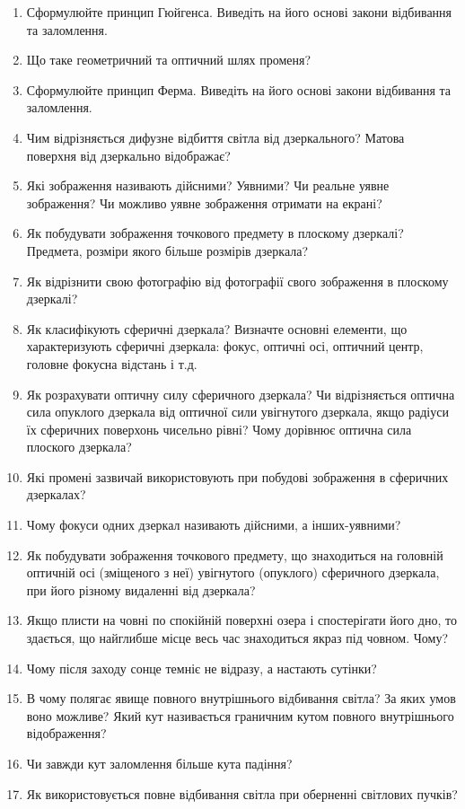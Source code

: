 \documentclass[12pt]{article}
\begin{document}
\begin{enumerate}[label*=\bfseries\color{red!60!black}\arabic*.,ref=\arabic*, wide,leftmargin=*]
\item Сформулюйте принцип Гюйгенса. Виведіть на його основі закони відбивання та заломлення.
\item Що таке геометричний та оптичний шлях променя?
\item Сформулюйте принцип Ферма. Виведіть на його основі закони відбивання та заломлення.
\item Чим відрізняється дифузне відбиття світла від дзеркального? Матова поверхня від дзеркально відображає?
\item Які зображення називають дійсними? Уявними? Чи реальне уявне зображення? Чи можливо уявне зображення отримати на екрані?
\item Як побудувати зображення точкового предмету в плоскому дзеркалі? Предмета, розміри якого більше розмірів дзеркала?
\item Як відрізнити свою фотографію від фотографії свого зображення в плоскому дзеркалі?
\item Як класифікують сферичні дзеркала? Визначте основні елементи, що характеризують сферичні дзеркала: фокус, оптичні осі, оптичний центр, головне фокусна відстань і т.д.
\item Як розрахувати оптичну силу сферичного дзеркала? Чи відрізняється оптична сила опуклого дзеркала від оптичної сили увігнутого дзеркала, якщо радіуси їх сферичних поверхонь чисельно рівні? Чому дорівнює оптична сила плоского дзеркала?
\item Які промені зазвичай використовують при побудові зображення в сферичних дзеркалах?
\item Чому фокуси одних дзеркал називають дійсними, а інших-уявними?
\item Як побудувати зображення точкового предмету, що знаходиться на головній оптичній осі (зміщеного з неї) увігнутого (опуклого) сферичного дзеркала, при його різному видаленні від дзеркала?
\item Якщо плисти на човні по спокійній поверхні озера і спостерігати його дно, то здається, що найглибше місце весь час знаходиться якраз під човном. Чому?
\item Чому після заходу сонце темніє не відразу, а настають сутінки?
\item В чому полягає явище повного внутрішнього відбивання світла? За яких умов воно можливе? Який кут називається граничним кутом повного внутрішнього відображення?
\item Чи завжди кут заломлення більше кута падіння?
\item Як використовується повне відбивання світла при оберненні світлових пучків? 

\end{enumerate}
\end{document}
